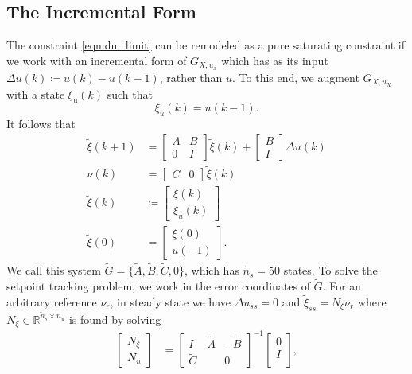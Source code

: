 \documentclass[journal,twocolumn,twoside]{IEEEtran/IEEEtran}
\newcommand{\du}{\ensuremath{\Delta u }\xspace}
\newcommand{\Gd}{\ensuremath{\tilde G }\xspace}
\newcommand{\Ad}{\ensuremath{\tilde A }\xspace}
\newcommand{\Bd}{\ensuremath{\tilde B }\xspace}
\newcommand{\Cd}{\ensuremath{\tilde C }\xspace}
\newcommand{\xd}{\ensuremath{\tilde \xi }\xspace}
\newcommand{\x}{\ensuremath{\xi }\xspace}
\newcommand{\xdss}{\ensuremath{\tilde \xi_{ss} }\xspace}
\newcommand{\y}{\ensuremath{\nu} \xspace}
\begin{document}
\subsection{The Incremental Form}
The constraint \eqref{eqn:du_limit} can be remodeled as a pure saturating constraint if we work with an incremental form of \(G_{X,u_x}\) which has as its input \({\Delta u(k)\coloneqq u(k)-u(k-1)}\), rather than \(u\). To this end, we augment \(G_{X,u_X}\) with a state \(\x_{\text{u}}(k)\) such that
\begin{equation*}
  \x_u(k) = u(k-1).
\end{equation*}
It follows that
\begin{subequations}
\begin{align}
  \xd(k+1)
  &=
    \begin{bmatrix}
      A & B\\ 0 & I
    \end{bmatrix}
    \xd(k)
    +
    \begin{bmatrix}
      B\\I
    \end{bmatrix}
  \Delta u(k) \\
  \y(k) & = \begin{bmatrix}C & 0\end{bmatrix}\xd(k)\\
  \xd(k)& \coloneqq \begin{bmatrix}\x(k)\\\x_u(k) \end{bmatrix}\\
  \xd(0) & = \begin{bmatrix}\x(0)\\u(-1)\end{bmatrix}. \label{eqn:x0_aug}
\end{align}\label{eqn:ssdelta}%
\end{subequations}
We call this system \(\Gd = \{\Ad, \Bd, \Cd, 0\}\), which has \({\tilde{n}_s=50}\) states.
To solve the setpoint tracking problem, we work in the error
coordinates of \(\Gd\).
For an arbitrary reference \(\y_r\), in steady state we have \({\du_{ss}=0}\) and \(\xdss =N_{\xi}\y_r\) where \({N_{\xi}\in\mathds{R}^{\tilde{n}_s\times n_u} }\) is found by solving
\begin{align}
  \begin{bmatrix}N_{\xi} \\ N_u\end{bmatrix} &=
\begin{bmatrix}I-\Ad & -\Bd\\\Cd & 0\end{bmatrix}^{-1}\begin{bmatrix}0\\ I\\\end{bmatrix}\label{eqn:nxnu},
\end{align}
\end{document}
